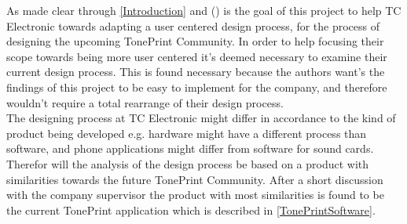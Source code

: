 
As made clear through \autoref{Introduction} and () is the goal of this project to help TC Electronic towards adapting a user centered design process, for the process of designing the upcoming TonePrint Community. In order to help focusing their scope towards being more user centered it's deemed necessary to examine their current design process. This is found necessary because the authors want's the findings of this project to be easy to implement for the company, and therefore wouldn't require a total rearrange of their design process. \\
The designing process at TC Electronic might differ in accordance to the kind of product being developed e.g. hardware might have a different process than software, and  phone applications might differ from software for sound cards. Therefor will the analysis of the design process be based on a product with similarities towards the future TonePrint Community. After a short discussion with the company supervisor the product with most similarities is found to be the current TonePrint application which is described in \autoref{TonePrintSoftware}. 

